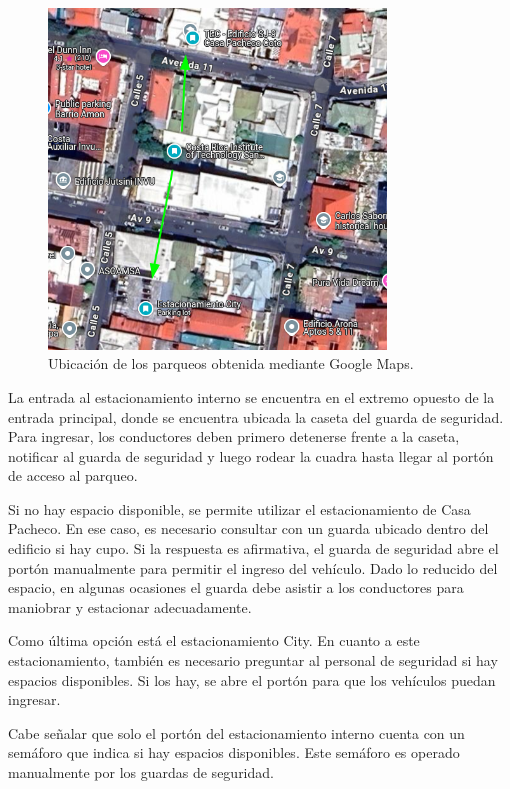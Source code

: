 \begin{figure}[H]
	\centering
	\includegraphics[width=0.8\textwidth]{fig/proy/ubiacion_parqueos.png}
	\caption{Ubicación de los parqueos obtenida mediante Google Maps.}
	\label{fig:ubiacion_parqueos}
\end{figure}

La entrada al estacionamiento interno se encuentra en el extremo opuesto de la entrada principal,
donde se encuentra ubicada la caseta del guarda de seguridad.
Para ingresar, los conductores deben primero detenerse frente a la caseta, notificar al guarda de seguridad
y luego rodear la cuadra hasta llegar al portón de acceso al parqueo.

Si no hay espacio disponible, se permite utilizar el estacionamiento de Casa Pacheco.
En ese caso, es necesario consultar con un guarda ubicado dentro del edificio si hay cupo.
Si la respuesta es afirmativa, el guarda de seguridad abre el portón manualmente para permitir
el ingreso del vehículo. Dado lo reducido del espacio, en algunas ocasiones el guarda debe asistir
a los conductores para maniobrar y estacionar adecuadamente.


Como última opción está el estacionamiento City. En cuanto a este estacionamiento,
también es necesario preguntar al personal de seguridad si hay espacios disponibles.
Si los hay, se abre el portón para que los vehículos puedan ingresar.


Cabe señalar que solo el portón del estacionamiento interno cuenta con un semáforo que indica si hay espacios disponibles.
Este semáforo es operado manualmente por los guardas de seguridad.

